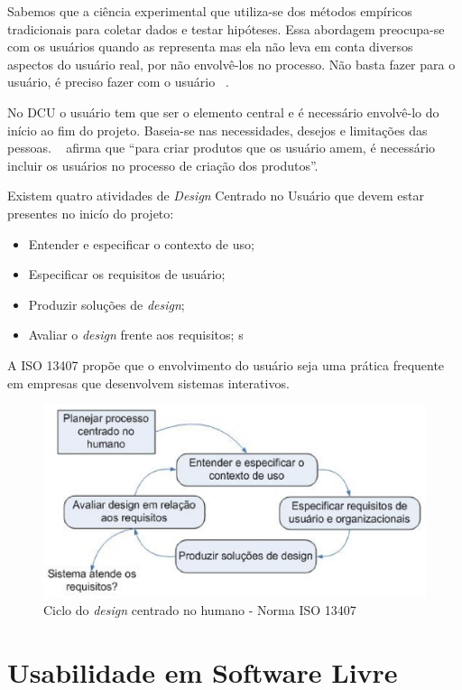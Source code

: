Sabemos que a ciência experimental que utiliza-se dos métodos empíricos tradicionais para coletar dados e testar hipóteses. Essa abordagem preocupa-se com os usuários quando as representa mas ela não leva em conta diversos aspectos do usuário real, por não envolvê-los no processo. Não basta fazer para o usuário, é preciso fazer com o usuário ~\cite{eason1995}. 

No DCU o usuário tem que ser o elemento central e é necessário envolvê-lo do início ao fim do projeto. Baseia-se nas necessidades, desejos e limitações das pessoas. ~ afirma que ``para criar produtos que os usuário amem, é necessário incluir os usuários no processo de criação dos produtos''. 


Existem quatro atividades de \emph{Design} Centrado no Usuário que devem estar presentes no inicío do projeto:

\begin{itemize}
\item Entender e especificar o contexto de uso;
\item Especificar os requisitos de usuário;
\item Produzir soluções de \emph{design};
\item Avaliar o \emph{design} frente aos requisitos;
s\end{itemize}

A ISO 13407 propõe que o envolvimento do usuário seja uma prática frequente em empresas que desenvolvem sistemas interativos.

\begin{figure}[h]
    \centering
    \includegraphics[keepaspectratio=true,scale=0.60]
      {figuras/ciclo_iso13407.eps}
    \caption{Ciclo do \emph{design} centrado no humano - Norma ISO 13407}
    \label{ciclo_iso13407}
\end{figure}


\section{Usabilidade em Software Livre}

